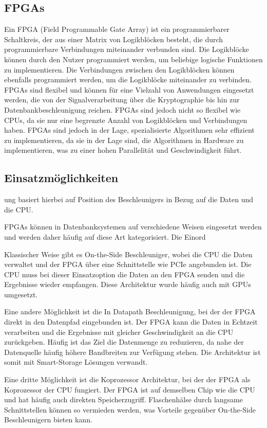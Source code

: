 \documentclass[conference]{IEEEtran}
\begin{document}
\subsection{FPGAs}
Ein FPGA (Field Programmable Gate Array) ist ein programmierbarer Schaltkreis, der aus einer Matrix von Logikblöcken besteht, die durch programmierbare Verbindungen miteinander verbunden sind.
Die Logikblöcke können durch den Nutzer programmiert werden, um beliebige logische Funktionen zu implementieren. Die Verbindungen zwischen den Logikblöcken können ebenfalls
programmiert werden, um die Logikblöcke miteinander zu verbinden. FPGAs sind flexibel und können für eine Vielzahl von Anwendungen eingesetzt werden, die von der Signalverarbeitung
über die Kryptographie bis hin zur Datenbankbeschleunigung reichen. FPGAs sind jedoch nicht so flexibel wie CPUs, da sie nur eine begrenzte Anzahl von Logikblöcken und Verbindungen
haben. FPGAs sind jedoch in der Lage, spezialisierte Algorithmen sehr effizient zu implementieren, da sie in der Lage sind, die Algorithmen in Hardware zu implementieren, was zu
einer hohen Parallelität und Geschwindigkeit führt.

\subsection{Einsatzmöglichkeiten}ung basiert hierbei auf Position des Beschleunigers
in Bezug auf die Daten und die CPU\@.

FPGAs können in Datenbanksystemen auf verschiedene Weisen eingesetzt werden und werden daher häufig auf diese Art kategorisiert. Die Einord

Klassischer Weise gibt es On-the-Side Beschleuniger, wobei die CPU die Daten
verwaltet und der FPGA über eine Schnittstelle wie PCIe angebunden ist. Die CPU muss bei dieser Einsatzoption die Daten an den FPGA senden und die Ergebnisse wieder
empfangen. Diese Architektur wurde häufig auch mit GPUs umgesetzt.

Eine andere Möglichkeit ist die In Datapath Beschleunigung, bei der der FPGA direkt in den Datenpfad eingebunden ist. Der FPGA kann die Daten in Echtzeit
verarbeiten und die Ergebnisse mit gleicher Geschwindigkeit an die CPU zurückgeben. Häufig ist das Ziel die Datenmenge zu reduzieren, da nahe der
Datenquelle häufig höhere Bandbreiten zur Verfügung stehen. Die Architektur ist somit mit Smart-Storage Lösungen verwandt.

Eine dritte Möglichkeit ist die Koprozessor Architektur, bei der der FPGA als Koprozessor der CPU fungiert. Der FPGA ist auf demselben Chip wie die CPU
und hat häufig auch direkten Speicherzugriff. Flaschenhälse durch langsame Schnittstellen können so vermieden werden, was Vorteile gegenüber
\mbox{On-the-Side} Beschleunigern bieten kann.
\end{document}
